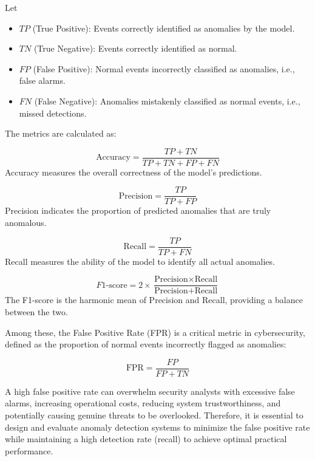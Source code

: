 \begin{ZhChapter}
    Let
    \begin{itemize}
        \item $TP$ (True Positive): Events correctly identified as anomalies by the model.
        \item $TN$ (True Negative): Events correctly identified as normal.
        \item $FP$ (False Positive): Normal events incorrectly classified as anomalies, i.e., false alarms.
        \item $FN$ (False Negative): Anomalies mistakenly classified as normal events, i.e., missed detections.
    \end{itemize}

    The metrics are calculated as:

    \begin{equation}
        \text{Accuracy} = \frac{TP + TN}{TP + TN + FP + FN}
    \end{equation}
    Accuracy measures the overall correctness of the model's predictions.

    \begin{equation}
        \text{Precision} = \frac{TP}{TP + FP}
    \end{equation}
    Precision indicates the proportion of predicted anomalies that are truly anomalous.

    \begin{equation}
        \text{Recall} = \frac{TP}{TP + FN}
    \end{equation}
    Recall measures the ability of the model to identify all actual anomalies.

    \begin{equation}
        F1\text{-score} = 2 \times \frac{\text{Precision} \times \text{Recall}}{\text{Precision} + \text{Recall}}
    \end{equation}
    The F1-score is the harmonic mean of Precision and Recall, providing a balance between the two.

    Among these, the False Positive Rate (FPR) is a critical metric in cybersecurity, defined as the proportion of normal events incorrectly flagged as anomalies:

    \begin{equation}
        \text{FPR} = \frac{FP}{FP + TN}
    \end{equation}

    A high false positive rate can overwhelm security analysts with excessive false alarms, increasing operational costs, reducing system trustworthiness, and potentially causing genuine threats to be overlooked. Therefore, it is essential to design and evaluate anomaly detection systems to minimize the false positive rate while maintaining a high detection rate (recall) to achieve optimal practical performance.


\end{ZhChapter}
